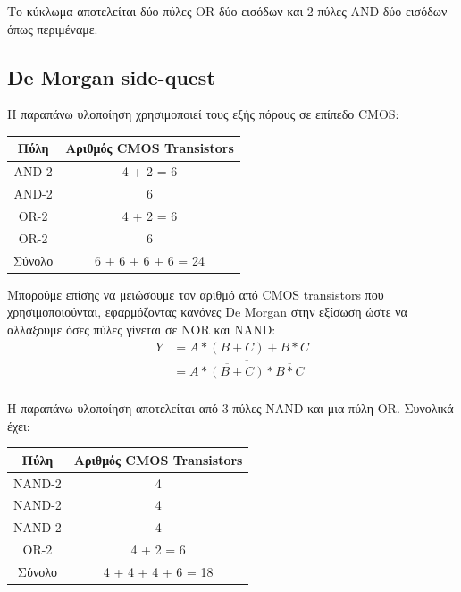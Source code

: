 \documentclass[]{article}
\begin{document}
Το κύκλωμα αποτελείται δύο πύλες OR δύο εισόδων και 2 πύλες AND δύο εισόδων όπως περιμέναμε.

\subsection{De Morgan side-quest}
Η παραπάνω υλοποίηση χρησιμοποιεί τους εξής πόρους σε επίπεδο CMOS:
\begin{center}
	\begin{tabular}{| c | c |}
		\hline Πύλη   & Αριθμός CMOS Transistors \\
		\hline AND-2  & 4 + 2 = 6                \\
		AND-2         & 6                        \\
		OR-2          & 4 + 2 = 6                \\
		OR-2          & 6                        \\
		\hline Σύνολο & 6 + 6 + 6 + 6 = 24       \\
		\hline
	\end{tabular}
\end{center}

Μπορούμε επίσης να μειώσουμε τον αριθμό από CMOS transistors που χρησιμοποιούνται, εφαρμόζοντας κανόνες De Morgan στην εξίσωση ώστε να αλλάξουμε όσες πύλες γίνεται σε NOR και NAND:
\begin{align*}
	Y & = A * (B + C) + B * C                                  \\
	  & = \overline{\overline{A * (B + C)} * \overline{B * C}} \\
\end{align*}

Η παραπάνω υλοποίηση αποτελείται από 3 πύλες NAND και μια πύλη OR.
Συνολικά έχει:
\begin{center}
	\begin{tabular}{| c | c |}
		\hline Πύλη   & Αριθμός CMOS Transistors \\
		\hline NAND-2 & 4                        \\
		NAND-2        & 4                        \\
		NAND-2        & 4                        \\
		OR-2          & 4 + 2 = 6                \\
		\hline Σύνολο & 4 + 4 + 4 + 6 = 18       \\
		\hline
	\end{tabular}
\end{center}
\end{document}
